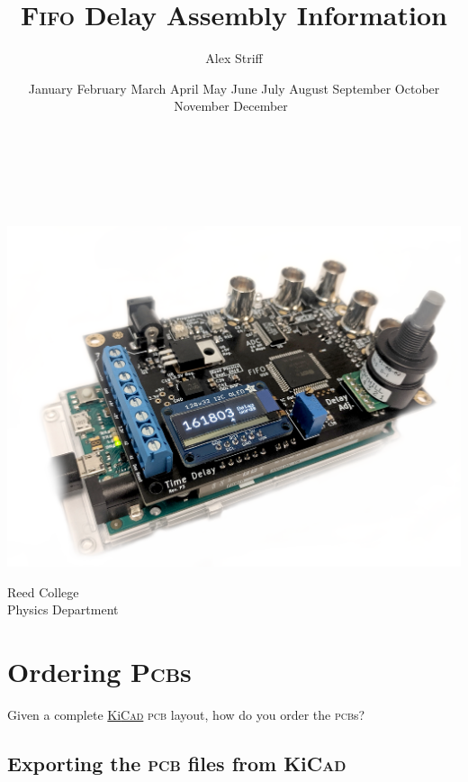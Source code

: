 \documentclass[12pt]{article}
\renewcommand{\today}{\ifcase\month\or%
  January\or%
  February\or%
  March\or%
  April\or%
  May\or%
  June\or%
  July\or%
  August\or%
  September\or%
  October\or%
  November\or%
  December\fi~%
\number\year}
\newcommand{\kicad}{Ki\textsc{Cad}}
\begin{document}
\title{\textsc{Fifo} Delay Assembly Information}
\author{Alex Striff}
\date{\today}

\begin{titlingpage} %
    \begin{center}
        \vfill\null%
        \begin{Huge} 
            \thetitle\\
        \end{Huge}
        \vspace{0.5cm}
        \begin{Large}
            \theauthor\\
        \end{Large}
        \vfill\null%
        \includegraphics[width=0.625\linewidth]{fifo-p3f-img-small.png}\\
        \vfill\null%
        \begin{large}
        Reed College \\
        Physics Department\\
        \vspace{0.5\baselineskip}
        \thedate%
        \end{large}
        \tableofcontents%
    \end{center}
\end{titlingpage}

\section{Ordering \textsc{Pcb}s}

Given a complete \href{https://kicad-pcb.org}{\kicad} \textsc{pcb} layout, how
do you order the \textsc{pcb}s?

\subsection{Exporting the \textsc{pcb} files from \kicad}
\end{document}
